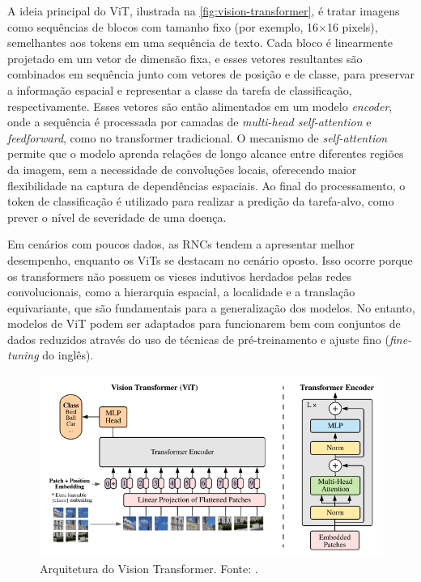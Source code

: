 A ideia principal do ViT, ilustrada na \autoref{fig:vision-transformer}, é tratar imagens como sequências de blocos com tamanho fixo (por exemplo, 16×16 pixels), semelhantes aos tokens em uma sequência de texto. Cada bloco é linearmente projetado em um vetor de dimensão fixa, e esses vetores resultantes são combinados em sequência junto com vetores de posição e de classe, para preservar a informação espacial e representar a classe da tarefa de classificação, respectivamente. Esses vetores são então alimentados em um modelo \textit{encoder}, onde a sequência é processada por camadas de \textit{multi-head self-attention} e \textit{feedforward}, como no transformer tradicional. O mecanismo de \textit{self-attention} permite que o modelo aprenda relações de longo alcance entre diferentes regiões da imagem, sem a necessidade de convoluções locais, oferecendo maior flexibilidade na captura de dependências espaciais. Ao final do processamento, o token de classificação é utilizado para realizar a predição da tarefa-alvo, como prever o nível de severidade de uma doença.

Em cenários com poucos dados, as RNCs tendem a apresentar melhor desempenho, enquanto os ViTs se destacam no cenário oposto. Isso ocorre porque os transformers não possuem os vieses indutivos herdados pelas redes convolucionais, como a hierarquia espacial, a localidade e a translação equivariante, que são fundamentais para a generalização dos modelos. No entanto, modelos de ViT podem ser adaptados para funcionarem bem com conjuntos de dados reduzidos através do uso de técnicas de pré-treinamento e ajuste fino (\textit{fine-tuning} do inglês).

\begin{figure}[h]
    \centering
    \includegraphics[width=1.0\linewidth]{figs/vision-transformer.png}
    \caption{Arquitetura do Vision Transformer. Fonte: \cite{Dosovitskiy2021}.}
    \label{fig:vision-transformer}
\end{figure}

